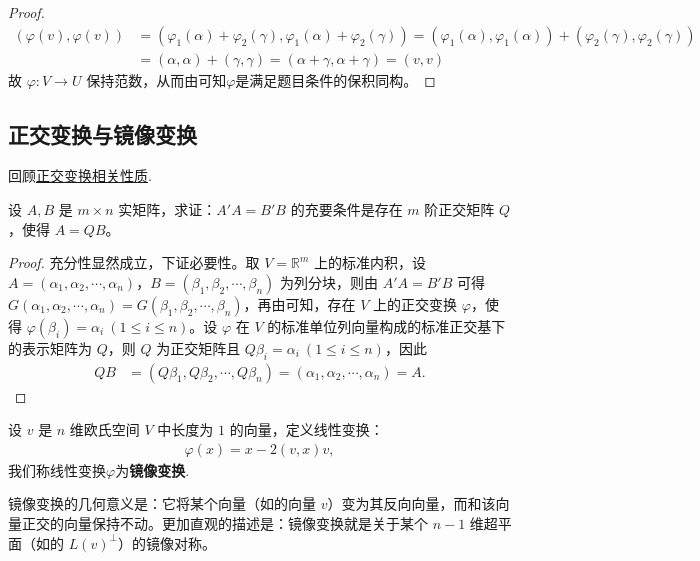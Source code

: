 \documentclass[../../main.tex]{subfiles}%
\begin{document}
\begin{proof}
\begin{align*}
(\varphi(v),\varphi(v)) &= (\varphi_1(\alpha) + \varphi_2(\gamma),\varphi_1(\alpha) + \varphi_2(\gamma)) = (\varphi_1(\alpha),\varphi_1(\alpha)) + (\varphi_2(\gamma),\varphi_2(\gamma))\\
&= (\alpha,\alpha) + (\gamma,\gamma) = (\alpha + \gamma,\alpha + \gamma) = (v,v)
\end{align*}
故 \(\varphi:V \to U\) 保持范数，从而由可知$\varphi$是满足题目条件的保积同构。
\end{proof}


\subsection{正交变换与镜像变换}

回顾\hyperref[theorem:正交变换和酉变换的基本性质]{正交变换相关性质}.

\begin{proposition}\label{proposition:例9.39}
设 \(A,B\) 是 \(m\times n\) 实矩阵，求证：\(A'A = B'B\) 的充要条件是存在 \(m\) 阶正交矩阵 \(Q\)，使得 \(A = QB\)。
\end{proposition}
\begin{proof}
充分性显然成立，下证必要性。取 \(V = \mathbb{R}^m\) 上的标准内积，设 \(A = (\alpha_1,\alpha_2,\cdots,\alpha_n)\)，\(B = (\beta_1,\beta_2,\cdots,\beta_n)\) 为列分块，则由 \(A'A = B'B\) 可得 \(G(\alpha_1,\alpha_2,\cdots,\alpha_n) = G(\beta_1,\beta_2,\cdots,\beta_n)\)，再由可知，存在 \(V\) 上的正交变换 \(\varphi\)，使得 \(\varphi(\beta_i) = \alpha_i\ (1\leqslant  i \leqslant  n)\)。设 \(\varphi\) 在 \(V\) 的标准单位列向量构成的标准正交基下的表示矩阵为 \(Q\)，则 \(Q\) 为正交矩阵且 \(Q\beta_i = \alpha_i\ (1\leqslant  i \leqslant  n)\)，因此
\begin{align*}
QB &= (Q\beta_1,Q\beta_2,\cdots,Q\beta_n) = (\alpha_1,\alpha_2,\cdots,\alpha_n) = A.
\end{align*}
\end{proof}

\begin{definition}[镜像变换]
设 \(v\) 是 \(n\) 维欧氏空间 \(V\) 中长度为 \(1\) 的向量，定义线性变换：
\begin{align*}
\varphi(x) = x - 2(v,x)v,
\end{align*}
我们称线性变换$\varphi$为\textbf{镜像变换}.
\end{definition}
\begin{remark}
镜像变换的几何意义是：它将某个向量（如的向量 \(v\)）变为其反向向量，而和该向量正交的向量保持不动。更加直观的描述是：镜像变换就是关于某个 \(n - 1\) 维超平面（如的 \(L(v)^{\perp}\)）的镜像对称。
\end{remark}
\end{document}
